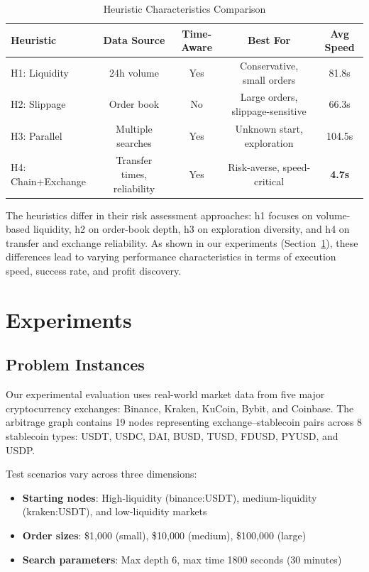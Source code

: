 \documentclass[11pt]{article}
\begin{document}
\begin{table}[h]
\centering
\caption{Heuristic Characteristics Comparison}
\label{tab:heuristic-comparison}
\begin{tabular}{lcccc}
\toprule
\textbf{Heuristic} & \textbf{Data Source} & \textbf{Time-Aware} & \textbf{Best For} & \textbf{Avg Speed} \\
\midrule
H1: Liquidity & 24h volume & Yes & Conservative, small orders & 81.8s \\
H2: Slippage & Order book & No & Large orders, slippage-sensitive & 66.3s \\
H3: Parallel & Multiple searches & Yes & Unknown start, exploration & 104.5s \\
H4: Chain+Exchange & Transfer times, reliability & Yes & Risk-averse, speed-critical & \textbf{4.7s} \\
\bottomrule
\end{tabular}
\end{table}

The heuristics differ in their risk assessment approaches: h1 focuses on volume-based liquidity, h2 on order-book depth, h3 on exploration diversity, and h4 on transfer and exchange reliability. As shown in our experiments (Section~\ref{sec:experiments}), these differences lead to varying performance characteristics in terms of execution speed, success rate, and profit discovery.

\section{Experiments}
\label{sec:experiments}

\subsection{Problem Instances}

Our experimental evaluation uses real-world market data from five major cryptocurrency exchanges: Binance, Kraken, KuCoin, Bybit, and Coinbase. The arbitrage graph contains 19 nodes representing exchange--stablecoin pairs across 8 stablecoin types: USDT, USDC, DAI, BUSD, TUSD, FDUSD, PYUSD, and USDP.

Test scenarios vary across three dimensions:
\begin{itemize}
\item \textbf{Starting nodes}: High-liquidity (binance:USDT), medium-liquidity (kraken:USDT), and low-liquidity markets
\item \textbf{Order sizes}: \$1,000 (small), \$10,000 (medium), \$100,000 (large)
\item \textbf{Search parameters}: Max depth 6, max time 1800 seconds (30 minutes)
\end{itemize}
\end{document}
